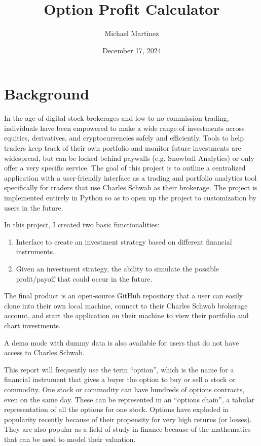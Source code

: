 \documentclass{article}
\title{Option Profit Calculator}
\author{Michael Martinez}
\date{December 17, 2024} %
\begin{document}
\maketitle

\section{Background}
\indent In the age of digital stock brokerages and low-to-no commission trading, individuals have been empowered to make a wide range of investments across equities, derivatives, and cryptocurrencies safely and efficiently. Tools to help traders keep track of their own portfolio and monitor future investments are widespread, but can be locked behind paywalls (e.g. Snowball Analytics) or only offer a very specific service. The goal of this project is to outline a centralized application with a user-friendly interface as a trading and portfolio analytics tool specifically for traders that use Charles Schwab as their brokerage. The project is implemented entirely in Python so as to open up the project to customization by users in the future. 

\indent In this project, I created two basic functionalities: 
\begin{enumerate}
    \item Interface to create an investment strategy based on different financial instruments.
    \item Given an investment strategy, the ability to simulate the possible profit/payoff that could occur in the future.
\end{enumerate}

The final product is an open-source GitHub repository that a user can easily clone into their own local machine, connect to their Charles Schwab brokerage account, and start the application on their machine to view their portfolio and chart investments. 

\indent A demo mode with dummy data is also available for users that do not have access to Charles Schwab. 

\indent This report will frequently use the term \enquote{option}, which is the name for a financial instrument that gives a buyer the option to buy or sell a stock or commodity. One stock or commodity can have hundreds of options contracts, even on the same day. These can be represented in an \enquote{options chain}, a tabular representation of all the options for one stock. Options have exploded in popularity recently because of their propensity for very high returns (or losses). They are also popular as a field of study in finance because of the mathematics that can be used to model their valuation. 
\end{document}
